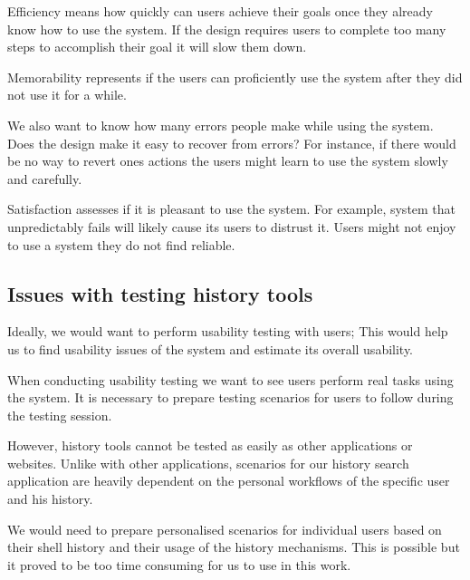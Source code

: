 Efficiency means how quickly can users achieve their goals once they already know how to use the system. If the design requires users to complete too many steps to accomplish their goal it will slow them down. 

Memorability represents if the users can proficiently use the system after they did not use it for a while. 

We also want to know how many errors people make while using the system. Does the design make it easy to recover from errors? For instance, if there would be no way to revert ones actions the users might learn to use the system slowly and carefully. 

Satisfaction assesses if it is pleasant to use the system. For example, system that unpredictably fails will likely cause its users to distrust it. Users might not enjoy to use a system they do not find reliable. 


\subsection{Issues with testing history tools}

Ideally, we would want to perform usability testing with users; This would help us to find usability issues of the system and estimate its overall usability.

When conducting usability testing we want to see users perform real tasks using the system. It is necessary to prepare testing scenarios for users to follow during the testing session.

However, history tools cannot be tested as easily as other applications or websites.
Unlike with other applications, scenarios for our history search application are heavily dependent on the personal workflows of the specific user and his history.


We would need to prepare personalised scenarios for individual users based on their shell history and their usage of the history mechanisms.
This is possible but it proved to be too time consuming for us to use in this work.

